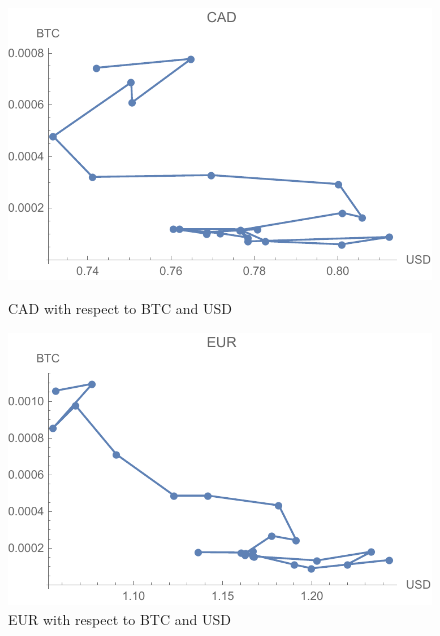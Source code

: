
\begin{figure}[!htb]
	\includegraphics[width=\linewidth]{figures/cad.pdf}
	\caption{CAD with respect to BTC and USD}\label{fig:cad}
	\endminipage\hfill
	\includegraphics[width=\linewidth]{figures/eur.pdf}
	\caption{EUR with respect to BTC and USD}\label{fig:eur}
	\endminipage\hfill
\end{figure}

